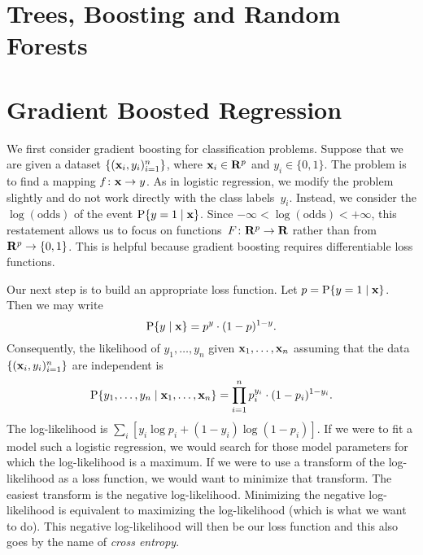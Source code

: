\chapter{Trees, Boosting and Random Forests}

\chapter{Gradient Boosted Regression}

We first consider gradient boosting for classification problems. Suppose that 
we are given a dataset $\{(\mathbf{x}_i, y_i)_{i = 1}^{n}\}$, where 
$\mathbf{x}_i \in \mathbf{R}^p$ and $y_i \in \{0, 1\}$. The problem is to find a mapping 
$f \colon \mathbf{x} \to y$. As in logistic regression, we modify the problem 
slightly and do not work directly with the class labels~$y_i$. Instead, we 
consider the $\log (\text{odds})$ of the event $\operatorname{P} \{y = 1 \mid \mathbf{x} \}$. 
Since $- \infty < \log (\text{odds}) < + \infty$, this restatement allows us 
to focus on functions~$F \colon \mathbf{R}^p \to \mathbf{R}$ rather than from 
$\mathbf{R}^p \to \{0, 1\}$. This is helpful because gradient boosting requires 
differentiable loss functions. 

Our next step is to build an appropriate loss function. Let 
$p = \operatorname{P} \{y = 1 \mid \mathbf{x} \}$. Then we may write
\[
    \operatorname{P} \{y \mid \mathbf{x} \} = p^y \cdot (1 - p)^{1 - y}.
\] 
Consequently, the likelihood of $y_1, \ldots, y_n$ given 
$\mathbf{x}_1, \ldots, \mathbf{x}_n$ assuming that the data 
$\{(\mathbf{x}_i, y_i)_{i = 1}^{n}\}$ are independent is
\[
    \operatorname{P} \{y_1, \ldots, y_n \mid \mathbf{x}_1, \ldots, \mathbf{x}_n \} 
        =   \prod_{i = 1}^{n} p_{i}^{y_i} \cdot (1 - p_i)^{1 - y_i}.
\]
The log-likelihood is $\sum_{i} \left [ y_i \log p_i + (1 - y_i) \log (1 - p_i) \right ]$. 
If we were to fit a model such a logistic regression, we would search for 
those model parameters for which the log-likelihood is a maximum. If we 
were to use a transform of the log-likelihood as a loss function, we would
want to minimize that transform. The easiest transform is the negative 
log-likelihood. Minimizing the negative log-likelihood is equivalent to maximizing
the log-likelihood (which is what we want to do). 
This negative log-likelihood will then be our loss function and this also 
goes by the name of \emph{cross entropy}.
 
